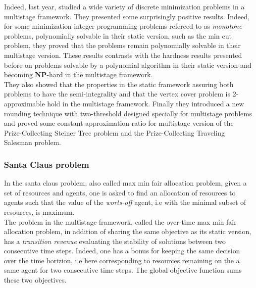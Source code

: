 \documentclass[a4paper]{book}
\begin{document}
Indeed, last year, \cite{bampis2019lp} studied a wide variety of discrete minimization problems in a multistage framework. They presented some surprisingly positive results. Indeed, for some minimization integer programming problems refereed to as \textit{monotone} problems, polynomially solvable in their static version, such as the {\sc min cut} problem, they proved that the problems remain polynomially solvable in their multistage version. These results contrasts with the hardness results presented before on problems solvable by a polynomial algorithm in their static version and becoming \textbf{NP}-hard in the multistage framework.
\\
They also showed that the properties in the static framework assuring both problems to have the semi-integrality and that the {\sc vertex cover} problem is 2-approximable hold in the multistage framework. Finally they introduced a new rounding technique with two-threshold designed specially for multistage problems and proved some constant approximation ratio for multistage version of the {\sc Prize-Collecting Steiner Tree} problem and the {\sc Prize-Collecting Traveling Salesman} problem. 



\subsubsection{Santa Claus problem}
In the {\sc santa claus} problem, also called {\sc max min fair allocation} problem, given a set of resources and agents, one is asked to find an allocation of resources to agents such that the value of the \textit{worts-off} agent, i.e with the minimal subset of resources, is maximum. \\
The problem in the multistage framework, called the {\sc over-time max min fair allocation} problem, in addition of sharing the same objective as its static version, has a \textit{transition revenue} evaluating the stability of solutions between two consecutive time steps. Indeed, one has a bonus for keeping the same decision over the time horizion, i.e here corresponding to resources remaining on the a same agent for two consecutive time steps. The global objective function sums these two objectives.\\
\end{document}
